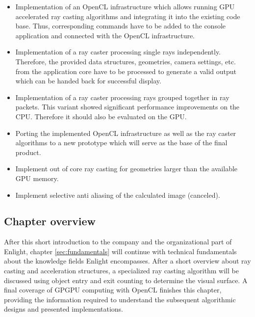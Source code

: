 \begin{itemize}
	\item Implementation of an OpenCL infrastructure which allows running GPU accelerated ray casting algorithms and integrating it into the existing code base. Thus, corresponding commands have to be added to the console application and connected with the OpenCL infrastructure.
	
	\item Implementation of a ray caster processing single rays independently. Therefore, the provided data structures, geometries, camera settings, etc. from the application core have to be processed to generate a valid output which can be handed back for successful display.
	
	\pagebreak
	
	\item Implementation of a ray caster processing rays grouped together in ray packets. This variant showed significant performance improvements on the CPU. Therefore it should also be evaluated on the GPU.
	
	\item Porting the implemented OpenCL infrastructure as well as the ray caster algorithms to a new prototype which will serve as the base of the final product.
	
	\item Implement out of core ray casting for geometries larger than the available GPU memory.
	
	\item Implement selective anti aliasing of the calculated image (canceled).
\end{itemize}


\subsection{Chapter overview}

After this short introduction to the company and the organizational part of Enlight,  chapter \ref{sec:fundamentals} will continue with technical fundamentals about the knowledge fields Enlight encompasses. After a short overview about ray casting and acceleration structures, a specialized ray casting algorithm will be discussed using object entry and exit counting to determine the visual surface. A final coverage of GPGPU computing with OpenCL finishes this chapter, providing the information required to understand the subsequent algorithmic designs and presented implementations.

